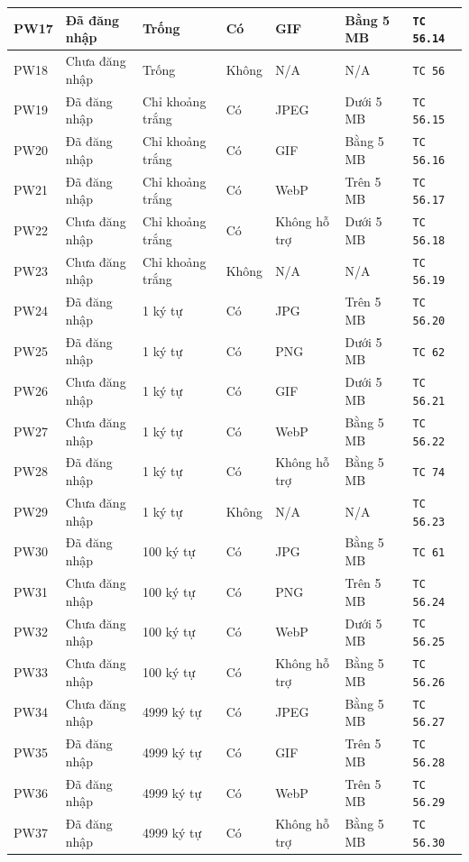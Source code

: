 \documentclass[11pt,a4paper]{article}
\begin{document}
\begin{longtable}{|C{1.2cm}|L{2.4cm}|L{2.6cm}|C{1.6cm}|L{2.5cm}|L{2.2cm}|C{2.0cm}|}
PW17 & Đã đăng nhập & Trống & Có & GIF & Bằng 5 MB & \texttt{TC 56.14} \\ \hline
PW18 & Chưa đăng nhập & Trống & Không & N/A & N/A & \texttt{TC 56} \\ \hline
PW19 & Đã đăng nhập & Chỉ khoảng trắng & Có & JPEG & Dưới 5 MB & \texttt{TC 56.15} \\ \hline
PW20 & Đã đăng nhập & Chỉ khoảng trắng & Có & GIF & Bằng 5 MB & \texttt{TC 56.16} \\ \hline
PW21 & Đã đăng nhập & Chỉ khoảng trắng & Có & WebP & Trên 5 MB & \texttt{TC 56.17} \\ \hline
PW22 & Chưa đăng nhập & Chỉ khoảng trắng & Có & Không hỗ trợ & Dưới 5 MB & \texttt{TC 56.18} \\ \hline
PW23 & Chưa đăng nhập & Chỉ khoảng trắng & Không & N/A & N/A & \texttt{TC 56.19} \\ \hline
PW24 & Đã đăng nhập & 1 ký tự & Có & JPG & Trên 5 MB & \texttt{TC 56.20} \\ \hline
PW25 & Đã đăng nhập & 1 ký tự & Có & PNG & Dưới 5 MB & \texttt{TC 62} \\ \hline
PW26 & Chưa đăng nhập & 1 ký tự & Có & GIF & Dưới 5 MB & \texttt{TC 56.21} \\ \hline
PW27 & Chưa đăng nhập & 1 ký tự & Có & WebP & Bằng 5 MB & \texttt{TC 56.22} \\ \hline
PW28 & Đã đăng nhập & 1 ký tự & Có & Không hỗ trợ & Bằng 5 MB & \texttt{TC 74} \\ \hline
PW29 & Chưa đăng nhập & 1 ký tự & Không & N/A & N/A & \texttt{TC 56.23} \\ \hline
PW30 & Đã đăng nhập & 100 ký tự & Có & JPG & Bằng 5 MB & \texttt{TC 61} \\ \hline
PW31 & Chưa đăng nhập & 100 ký tự & Có & PNG & Trên 5 MB & \texttt{TC 56.24} \\ \hline
PW32 & Chưa đăng nhập & 100 ký tự & Có & WebP & Dưới 5 MB & \texttt{TC 56.25} \\ \hline
PW33 & Chưa đăng nhập & 100 ký tự & Có & Không hỗ trợ & Bằng 5 MB & \texttt{TC 56.26} \\ \hline
PW34 & Chưa đăng nhập & 4999 ký tự & Có & JPEG & Bằng 5 MB & \texttt{TC 56.27} \\ \hline
PW35 & Đã đăng nhập & 4999 ký tự & Có & GIF & Trên 5 MB & \texttt{TC 56.28} \\ \hline
PW36 & Đã đăng nhập & 4999 ký tự & Có & WebP & Trên 5 MB & \texttt{TC 56.29} \\ \hline
PW37 & Đã đăng nhập & 4999 ký tự & Có & Không hỗ trợ & Bằng 5 MB & \texttt{TC 56.30} \\ \hline

\end{longtable}
\end{document}
